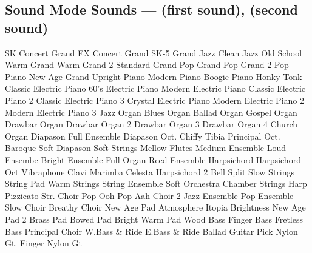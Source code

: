 \subsection{Sound Mode Sounds --- \UiKey{\I}\UiKey{\SND} (first sound), \UiKey{\II}\UiKey{\SND} (second sound)}
SK Concert Grand
EX Concert Grand
SK-5 Grand
Jazz Clean
Jazz Old School
Warm Grand
Warm Grand 2
Standard Grand
Pop Grand
Pop Grand 2
Pop Piano
New Age Grand
Upright Piano
Modern Piano
Boogie Piano
Honky Tonk
Classic Electric Piano
60's Electric Piano
Modern Electric Piano
Classic Electric Piano 2
Classic Electric Piano 3
Crystal Electric Piano
Modern Electric Piano 2
Modern Electric Piano 3
Jazz Organ
Blues Organ
Ballad Organ
Gospel Organ
Drawbar Organ
Drawbar Organ 2
Drawbar Organ 3
Drawbar Organ 4
Church Organ
Diapason
Full Ensemble
Diapason Oct.
Chiffy Tibia
Principal Oct.
Baroque
Soft Diapason
Soft Strings
Mellow Flutes
Medium Ensemble
Loud Ensembe
Bright Ensemble
Full Organ
Reed Ensemble
Harpsichord
Harpsichord Oct
Vibraphone
Clavi
Marimba
Celesta
Harpsichord 2
Bell Split
Slow Strings
String Pad
Warm Strings
String Ensemble
Soft Orchestra
Chamber Strings
Harp
Pizzicato Str.
Choir
Pop Ooh
Pop Aah
Choir 2
Jazz Ensemble
Pop Ensemble
Slow Choir
Breathy Choir
New Age Pad
Atmosphere
Itopia
Brightness
New Age Pad 2
Brass Pad
Bowed Pad
Bright Warm Pad
Wood Bass
Finger Bass
Fretless Bass
Principal Choir
W.Bass \& Ride
E.Bass \& Ride
Ballad Guitar
Pick Nylon Gt.
Finger Nylon Gt
